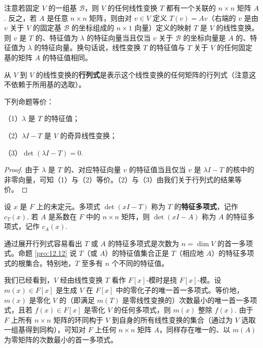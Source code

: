 注意若固定 \(V\) 的一组基 \(\mathcal{B}\)，则 \(V\) 的任何线性变换 \(T\) 都有一个关联的 \(n \times n\) 矩阵 \(A\). 反之，若 \(A\) 是任意 \(n \times n\) 矩阵，则由对 \(v \in V\) 定义 \(T(v) = Av\)（右端的 \(v\) 是由 \(v\) 关于 \(V\) 的固定基 \(\mathcal{B}\) 的坐标组成的 \(n \times 1\) 向量）定义的映射 \(T\) 是 \(V\) 的线性变换。则 \(v\) 是 \(T\) 的、特征值为 \(\lambda\) 的特征向量当且仅当 \(v\) 关于 \(\mathcal{B}\) 的坐标向量是 \(A\) 的、特征值为 \(\lambda\) 的特征向量。换句话说，线性变换 \(T\) 的特征值与 \(T\) 关于 \(V\) 的任何固定基的矩阵 \(A\) 的特征值相同。

\begin{definition}
从 \(V\) 到 \(V\) 的线性变换的\textbf{行列式}是表示这个线性变换的任何矩阵的行列式（注意这不依赖于所用基的选取）。
\end{definition}

\begin{proposition}\label{pro:12.12}
下列命题等价：

（1）\(\lambda\) 是 \(T\) 的特征值；

（2）\(\lambda I-T\) 是 \(V\) 的奇异线性变换；

（3）\(\det(\lambda I-T) = 0\).
\end{proposition}

\begin{proof}
由于 \(\lambda\) 是 \(T\) 的、对应特征向量 \(v\) 的特征值当且仅当 \(v\) 是 \(\lambda I-T\) 的核中的非零向量，可知（1）与（2）等价。（2）与（3）由我们关于行列式的结果等价。
\end{proof}

\begin{definition}
设 \(x\) 是 \(F\) 上的未定元。多项式 \(\det(xI-T)\) 称为 \(T\) 的\textbf{特征多项式}，记作 \(c_T(x)\). 若 \(A\) 是系数在 \(F\) 中的 \(n \times n\) 矩阵，则 \(\det(xI-A)\) 称为 \(A\) 的特征多项式，记作 \(c_A(x)\).
\end{definition}

通过展开行列式容易看出 \(T\) 或 \(A\) 的特征多项式是次数为 \(n = \dim V\) 的首一多项式。命题 \ref{pro:12.12} 说 \(T\)（或 \(A\)）的特征值集合正是 \(T\)（相应地 \(A\)）的特征多项式的根集合。特别地，\(T\) 至多有 \(n\) 个不同的特征值。

我们已经看到，\(V\) 经由线性变换 \(T\) 看作 \(F[x]\)-模时是挠 \(F[x]\)-模。设 \(m(x) \in F[x]\) 是生成 \(V\) 在 \(F[x]\) 中的零化子的唯一首一多项式。等价地，\(m(x)\) 是零化 \(V\) 的（即满足 \(m(T)\) 是零线性变换的）次数最小的唯一首一多项式，且若 \(f(x) \in F[x]\) 是零化 \(V\) 的任何多项式，则 \(m(x)\) 整除 \(f(x)\). 由于 \(F\) 上所有 \(n \times n\) 矩阵的环同构于 \(V\) 到自身的所有线性变换的集合（通过为 \(V\) 选取一组基得到同构），可知对 \(F\) 上任何 \(n \times n\) 矩阵 \(A\)，同样存在唯一的、以 \(m(A)\) 为零矩阵的次数最小的首一多项式。

